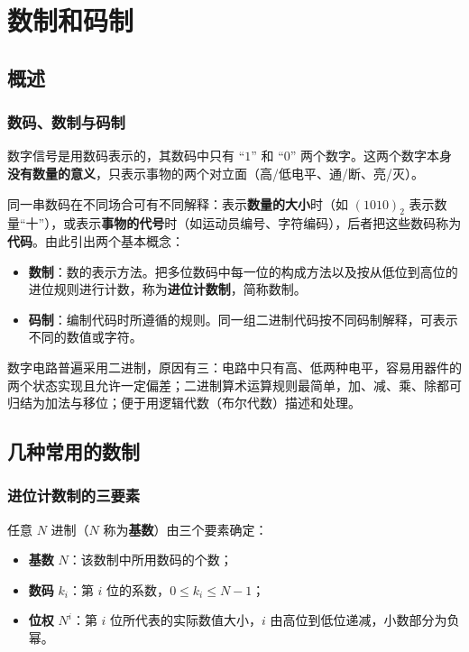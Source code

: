 \chapter{数制和码制}
\setlength{\parskip}{0.4em}
\setlength{\itemsep}{0.2em}
\setlength{\tabcolsep}{4pt}

\section{概述}
\subsection{数码、数制与码制}
数字信号是用数码表示的，其数码中只有 ``$1$'' 和 ``$0$'' 两个数字。这两个数字本身\textbf{没有数量的意义}，只表示事物的两个对立面（高/低电平、通/断、亮/灭）。

同一串数码在不同场合可有不同解释：表示\textbf{数量的大小}时（如 $(1010)_2$ 表示数量``十''），或表示\textbf{事物的代号}时（如运动员编号、字符编码），后者把这些数码称为\textbf{代码}。由此引出两个基本概念：
\begin{itemize}
    \item \textbf{数制}：数的表示方法。把多位数码中每一位的构成方法以及按从低位到高位的进位规则进行计数，称为\textbf{进位计数制}，简称数制。
    \item \textbf{码制}：编制代码时所遵循的规则。同一组二进制代码按不同码制解释，可表示不同的数值或字符。
\end{itemize}

数字电路普遍采用二进制，原因有三：电路中只有高、低两种电平，容易用器件的两个状态实现且允许一定偏差；二进制算术运算规则最简单，加、减、乘、除都可归结为加法与移位；便于用逻辑代数（布尔代数）描述和处理。

\section{几种常用的数制}
\subsection{进位计数制的三要素}
任意 $N$ 进制（$N$ 称为\textbf{基数}）由三个要素确定：
\begin{itemize}
    \item \textbf{基数} $N$：该数制中所用数码的个数；
    \item \textbf{数码} $k_i$：第 $i$ 位的系数，$0\le k_i\le N-1$；
    \item \textbf{位权} $N^i$：第 $i$ 位所代表的实际数值大小，$i$ 由高位到低位递减，小数部分为负幂。
\end{itemize}

